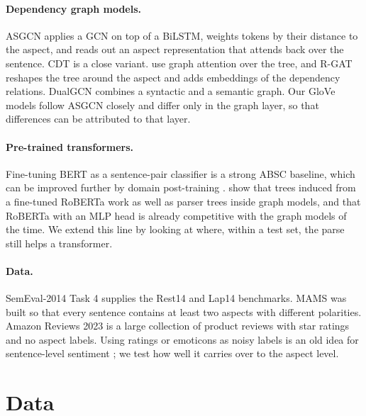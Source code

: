 \documentclass[11pt]{article}
\begin{document}
\paragraph{Dependency graph models.} ASGCN \citep{zhang-etal-2019-aspect} applies a GCN on top of a BiLSTM, weights tokens by their distance to the aspect, and reads out an aspect representation that attends back over the sentence. CDT \citep{sun-etal-2019-aspect} is a close variant. \citet{huang-carley-2019-syntax} use graph attention over the tree, and R-GAT \citep{wang-etal-2020-relational} reshapes the tree around the aspect and adds embeddings of the dependency relations. DualGCN \citep{li-etal-2021-dual} combines a syntactic and a semantic graph. Our GloVe models follow ASGCN closely and differ only in the graph layer, so that differences can be attributed to that layer.

\paragraph{Pre-trained transformers.} Fine-tuning BERT \citep{devlin-etal-2019-bert} as a sentence-pair classifier is a strong ABSC baseline, which can be improved further by domain post-training \citep{xu-etal-2019-bert}. \citet{dai-etal-2021-syntax} show that trees induced from a fine-tuned RoBERTa \citep{liu2019roberta} work as well as parser trees inside graph models, and that RoBERTa with an MLP head is already competitive with the graph models of the time. We extend this line by looking at where, within a test set, the parse still helps a transformer.

\paragraph{Data.} SemEval-2014 Task 4 \citep{pontiki-etal-2014-semeval} supplies the Rest14 and Lap14 benchmarks. MAMS \citep{jiang-etal-2019-challenge} was built so that every sentence contains at least two aspects with different polarities. Amazon Reviews 2023 \citep{hou2024bridging} is a large collection of product reviews with star ratings and no aspect labels. Using ratings or emoticons as noisy labels is an old idea for sentence-level sentiment \citep{go2009twitter}; we test how well it carries over to the aspect level.

\section{Data}
\label{sec:data}
\end{document}

